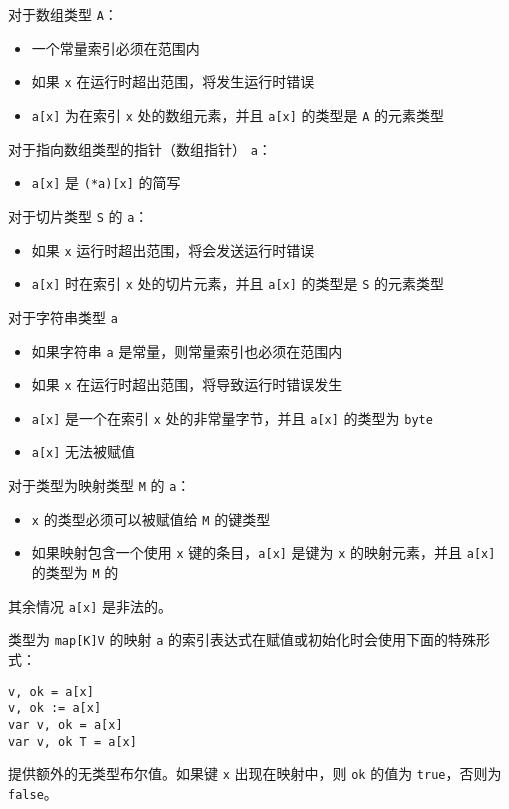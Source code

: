 对于数组类型 \lstinline|A|：
\begin{itemize}
\item 一个常量索引必须在范围内
\item 如果 \lstinline|x| 在运行时超出范围，将发生运行时错误
\item \lstinline|a[x]| 为在索引 \lstinline|x| 处的数组元素，并且 \lstinline|a[x]| 的类型是 \lstinline|A| 的元素类型
\end{itemize}
对于指向数组类型的指针（数组指针） \lstinline|a|：
\begin{itemize}
\item \lstinline|a[x]| 是 \lstinline|(*a)[x]| 的简写
\end{itemize}
对于切片类型 \lstinline|S| 的 \lstinline|a|：
\begin{itemize}
\item 如果 \lstinline|x| 运行时超出范围，将会发送运行时错误
\item \lstinline|a[x]| 时在索引 \lstinline|x| 处的切片元素，并且 \lstinline|a[x]| 的类型是 \lstinline|S| 的元素类型
\end{itemize}
对于字符串类型 \lstinline|a|
\begin{itemize}
\item 如果字符串 \lstinline|a| 是常量，则常量索引也必须在范围内
\item 如果 \lstinline|x| 在运行时超出范围，将导致运行时错误发生
\item \lstinline|a[x]| 是一个在索引 \lstinline|x| 处的非常量字节，并且 \lstinline|a[x]| 的类型为 \lstinline|byte|
\item \lstinline|a[x]| 无法被赋值
\end{itemize}
对于类型为映射类型 \lstinline|M| 的 \lstinline|a|：
\begin{itemize}
\item \lstinline|x| 的类型必须可以被赋值给 \lstinline|M| 的键类型
\item 如果映射包含一个使用 \lstinline|x| 键的条目，\lstinline|a[x]| 是键为 \lstinline|x| 的映射元素，并且 \lstinline|a[x]| 的类型为 \lstinline|M| 的
\end{itemize}
其余情况 \lstinline|a[x]| 是非法的。

类型为 \lstinline|map[K]V| 的映射 \lstinline|a| 的索引表达式在赋值或初始化时会使用下面的特殊形式：
\begin{lstlisting}[style=golang]
v, ok = a[x]
v, ok := a[x]
var v, ok = a[x]
var v, ok T = a[x]
\end{lstlisting}
提供额外的无类型布尔值。如果键 \lstinline|x| 出现在映射中，则 \lstinline|ok| 的值为 \lstinline|true|，否则为 \lstinline|false|。

